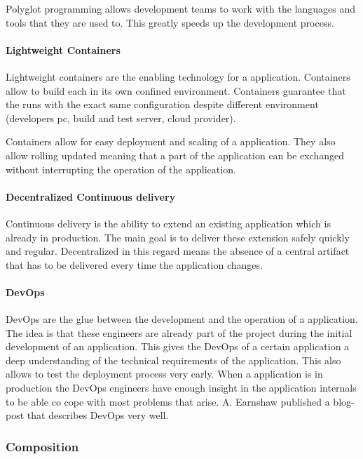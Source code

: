 Polyglot programming allows development teams to work with the languages and
tools that they are used to. This greatly speeds up the development process.

\paragraph{Lightweight Containers}

Lightweight containers are the enabling technology for a \ms{} application.
Containers allow to build each \ms{} in its own confined environment. Containers
guarantee that the \ms{} runs with the exact same configuration despite
different environment (developers pc, build and test server, cloud provider).

Containers allow for easy deployment and scaling of a \ms{} application. They
also allow rolling updated meaning that a part of the application can be
exchanged without interrupting the operation of the application.

\paragraph{Decentralized Continuous delivery}

Continuous delivery is the ability to extend an existing \ms{} application which
is already in production. The main goal is to deliver these extension safely
quickly and regular. Decentralized in this regard means the absence of a central
artifact that has to be delivered every time the application changes.

\paragraph{DevOps}

DevOps are the glue between the development and the operation of a \ms{}
application. The idea is that these engineers are already part of the project
during the initial development of an application. This gives the DevOps of a
certain application a deep understanding of the technical requirements of the
application. This also allows to test the deployment process very early. When a
\ms{} application is in production the DevOps engineers have enough insight in
the application internals to be able co cope with most problems that arise.
A. Earnshaw published a blog-post that describes DevOps very
well\cite{earnshaw2013devops}.

\subsubsection{\ms{} Composition}

